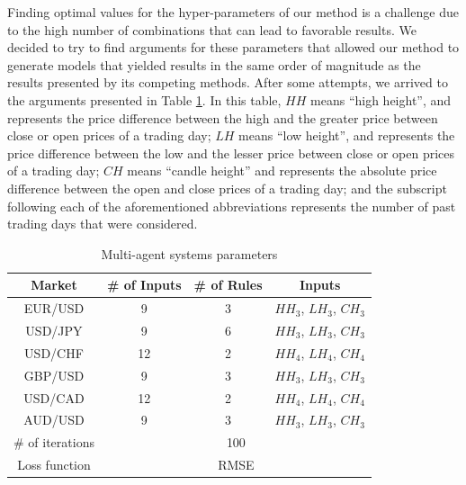 \documentclass{ieeeaccess}
\begin{document}
Finding optimal values for the hyper-parameters of our method is a
challenge due to the high number of combinations that can lead to
favorable results. We decided to try to find arguments for these
parameters that allowed our method to generate models that yielded
results in the same order of magnitude as the results presented by its
competing methods. After some attempts, we arrived to the arguments
presented in Table \ref{agents-parameters}. In this table, %
$HH$ means ``high height'', and represents
the price difference between the high and the greater price between
close or open prices of a trading day; $LH$ means ``low height'', and
represents the price difference between the low and the lesser price
between close or open prices of a trading day; $CH$ means ``candle
height'' and represents the absolute price difference between the open
and close prices of a trading day; and the subscript following each of
the aforementioned abbreviations represents the number of past trading
days that were considered.


\begin{table}[]
  \caption{Multi-agent systems parameters}
  \small
  \centering
  \begin{tabular}{cccc}
    \textbf{Market} & \textbf{\# of Inputs} & \textbf{\# of Rules} & \textbf{Inputs} \\
    \hline
    EUR/USD & 9 & 3 & $HH_3$, $LH_3$, $CH_3$ \\
    USD/JPY & 9 & 6 & $HH_3$, $LH_3$, $CH_3$ \\
    USD/CHF & 12 & 2 & $HH_4$, $LH_4$, $CH_4$ \\
    GBP/USD & 9 & 3 & $HH_3$, $LH_3$, $CH_3$ \\
    USD/CAD & 12 & 2 & $HH_4$, $LH_4$, $CH_4$ \\
    AUD/USD & 9 & 3 & $HH_3$, $LH_3$, $CH_3$ \\
    \hline
    \hline
    \# of iterations & \multicolumn{3}{c}{100} \\
    Loss function & \multicolumn{3}{c}{RMSE} \\
    \hline
  \end{tabular}
  \label{agents-parameters}
\end{table}
\end{document}
